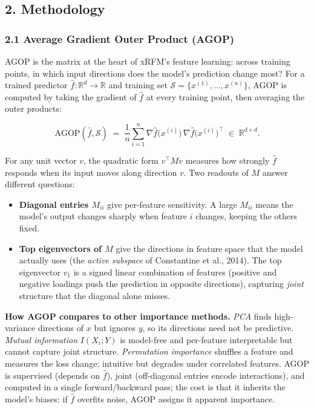 \documentclass[
  11pt,
  onecolumn]{article}
\providecommand{\tightlist}{%
  \setlength{\itemsep}{0pt}\setlength{\parskip}{0pt}}
\begin{document}
\subsection{2. Methodology}\label{methodology}

\subsubsection{2.1 Average Gradient Outer Product
(AGOP)}\label{average-gradient-outer-product-agop}

AGOP is the matrix at the heart of xRFM's feature learning: across
training points, in which input directions does the model's prediction
change most? For a trained predictor
\(\hat f: \mathbb{R}^d \to \mathbb{R}\) and training set
\(\mathcal{S} = \{x^{(1)}, \ldots, x^{(n)}\}\), AGOP is computed by
taking the gradient of \(\hat f\) at every training point, then
averaging the outer products:

\[
\mathrm{AGOP}(\hat f, \mathcal{S}) \;=\; \frac{1}{n}\sum_{i=1}^{n} \nabla \hat f\!\bigl(x^{(i)}\bigr)\,\nabla \hat f\!\bigl(x^{(i)}\bigr)^{\!\top} \;\in\; \mathbb{R}^{d\times d}. \tag{1}
\]

For any unit vector \(v\), the quadratic form \(v^\top M v\) measures
how strongly \(\hat f\) responds when its input moves along direction
\(v\). Two readouts of \(M\) answer different questions:

\begin{itemize}
\tightlist
\item
  \textbf{Diagonal entries \(M_{ii}\)} give per-feature sensitivity. A
  large \(M_{ii}\) means the model's output changes sharply when feature
  \(i\) changes, keeping the others fixed.
\item
  \textbf{Top eigenvectors of \(M\)} give the directions in feature
  space that the model actually uses (the \emph{active subspace} of
  Constantine et al., 2014). The top eigenvector \(v_1\) is a signed
  linear combination of features (positive and negative loadings push
  the prediction in opposite directions), capturing \emph{joint}
  structure that the diagonal alone misses.
\end{itemize}

\textbf{How AGOP compares to other importance methods.} \emph{PCA}
finds high-variance directions of \(x\) but ignores \(y\), so its
directions need not be predictive. \emph{Mutual information}
\(I(X_i; Y)\) is model-free and per-feature interpretable but cannot
capture joint structure. \emph{Permutation importance} shuffles a
feature and measures the loss change; intuitive but degrades under
correlated features. AGOP is supervised (depends on \(\hat f\)), joint
(off-diagonal entries encode interactions), and computed in a single
forward/backward pass; the cost is that it inherits the model's biases:
if \(\hat f\) overfits noise, AGOP assigns it apparent importance.
\end{document}
